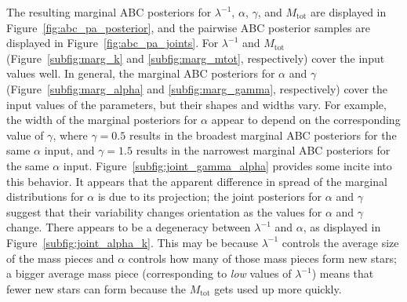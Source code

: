 \documentclass[12pt]{article}
\newcommand{\nobs}{n_{\text{obs}}}
\newcommand{\Mtot}{M_{\text{tot}}}
\begin{document}
%


The resulting marginal ABC posteriors for $\lambda^{-1}$, $\alpha$, $\gamma$, and $\Mtot$ are displayed in Figure~\ref{fig:abc_pa_posterior}, and the pairwise ABC posterior samples are displayed in Figure~\ref{fig:abc_pa_joints}.  
%
For $\lambda^{-1}$ and $\Mtot$ (Figure~\ref{subfig:marg_k} and \ref{subfig:marg_mtot}, respectively) cover the input values well.   
%
In general, the marginal ABC posteriors for $\alpha$ and $\gamma$ (Figure~\ref{subfig:marg_alpha} and \ref{subfig:marg_gamma}, respectively) cover the input values of the parameters, but their shapes and widths vary.  
%
For example, the width of the marginal posteriors for $\alpha$ appear to depend on the corresponding value of $\gamma$, where $\gamma = 0.5$ results in the broadest marginal ABC posteriors for the same $\alpha$ input, and $\gamma = 1.5$ results in the narrowest marginal ABC posteriors for the same $\alpha$ input. 
Figure~\ref{subfig:joint_gamma_alpha} provides some incite into this behavior.  It appears that the apparent difference in spread of the marginal distributions for $\alpha$ is due to its projection; the joint posteriors for $\alpha$ and $\gamma$ suggest that their variability changes orientation as the values for $\alpha$ and $\gamma$ change.
%
There appears to be a degeneracy between  $\lambda^{-1}$ and $\alpha$, as displayed in Figure~\ref{subfig:joint_alpha_k}.  This may be because $\lambda^{-1}$ controls the average size of the mass pieces and $\alpha$ controls how many of those mass pieces form new stars; a bigger average mass piece (corresponding to \emph{low} values of $\lambda^{-1}$) means that fewer new stars can form because the $\Mtot$ gets used up more quickly.
%
\end{document}
